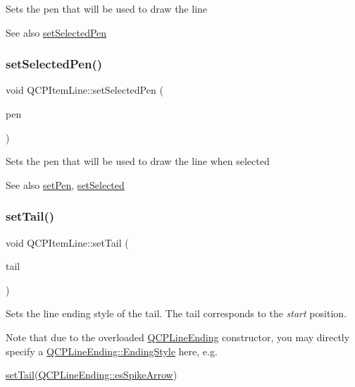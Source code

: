 Sets the pen that will be used to draw the line

\begin{DoxySeeAlso}{See also}
\hyperlink{class_q_c_p_item_line_a3e2fec44503277e77717e9c24f87f1ea}{set\+Selected\+Pen} 
\end{DoxySeeAlso}
\mbox{\label{class_q_c_p_item_line_a3e2fec44503277e77717e9c24f87f1ea}} 
\subsubsection{\texorpdfstring{set\+Selected\+Pen()}{setSelectedPen()}}
{\footnotesize\ttfamily void Q\+C\+P\+Item\+Line\+::set\+Selected\+Pen (\begin{DoxyParamCaption}\item[{const Q\+Pen \&}]{pen }\end{DoxyParamCaption})}

Sets the pen that will be used to draw the line when selected

\begin{DoxySeeAlso}{See also}
\hyperlink{class_q_c_p_item_line_a572528dab61c1abe205822fbd5db4b27}{set\+Pen}, \hyperlink{class_q_c_p_abstract_item_a203de94ad586cc44d16c9565f49d3378}{set\+Selected} 
\end{DoxySeeAlso}
\mbox{\label{class_q_c_p_item_line_ac264222c3297a7efe33df9345c811a5f}} 
\subsubsection{\texorpdfstring{set\+Tail()}{setTail()}}
{\footnotesize\ttfamily void Q\+C\+P\+Item\+Line\+::set\+Tail (\begin{DoxyParamCaption}\item[{const \hyperlink{class_q_c_p_line_ending}{Q\+C\+P\+Line\+Ending} \&}]{tail }\end{DoxyParamCaption})}

Sets the line ending style of the tail. The tail corresponds to the {\itshape start} position.

Note that due to the overloaded \hyperlink{class_q_c_p_line_ending}{Q\+C\+P\+Line\+Ending} constructor, you may directly specify a \hyperlink{class_q_c_p_line_ending_a5ef16e6876b4b74959c7261d8d4c2cd5}{Q\+C\+P\+Line\+Ending\+::\+Ending\+Style} here, e.\+g.
\begin{DoxyCode}
\hyperlink{class_q_c_p_item_line_ac264222c3297a7efe33df9345c811a5f}{setTail}(\hyperlink{class_q_c_p_line_ending_a5ef16e6876b4b74959c7261d8d4c2cd5ab9964d0d03f812d1e79de15edbeb2cbf}{QCPLineEnding::esSpikeArrow}) 
\end{DoxyCode}


